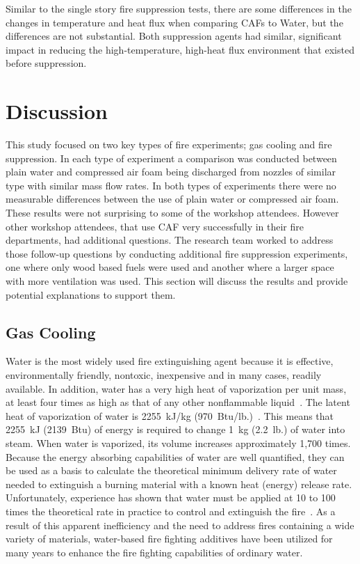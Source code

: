 \documentclass[12pt,oneside]{book}
\begin{document}
Similar to the single story fire suppression tests, there are some differences in the changes in temperature and heat flux when comparing CAFs to Water, but the differences are not substantial. Both suppression agents had similar, significant impact in reducing the high-temperature, high-heat flux environment that existed before suppression. 

\chapter{Discussion}
\label{chap:Discussion}

This study focused on two key types of fire experiments; gas cooling and fire suppression. In each type of experiment a comparison was conducted between plain water and compressed air foam being discharged from nozzles of similar type with similar mass flow rates.  In both types of experiments there were no measurable differences between the use of plain water or compressed air foam. These results were not surprising to some of the workshop attendees.  However other workshop attendees, that use CAF very successfully in their fire departments, had additional questions. The research team worked to address those follow-up questions by conducting additional fire suppression experiments, one where only wood based fuels were used and another where a larger space with more ventilation was used.  This section will discuss the results and provide potential explanations to support them.

\section{Gas Cooling}
\label{sec:Gas_Cooling_discuss}
 
Water is the most widely used fire extinguishing agent because it is effective, environmentally friendly, nontoxic, inexpensive and in many cases, readily available. In addition, water has a very high heat of vaporization per unit mass, at least four times as high as that of any other nonflammable liquid~\cite{NFPA}. The latent heat of vaporization of water is 2255~kJ/kg (970~Btu/lb.)~\cite{NFPA}. This means that 2255~kJ (2139~Btu) of energy is required to change 1~kg (2.2~lb.) of water into steam.  When water is vaporized, its volume increases approximately 1,700 times. Because the energy absorbing capabilities of water are well quantified, they can be used as a basis to calculate the theoretical minimum delivery rate of water needed to extinguish a burning material with a known heat (energy) release rate. Unfortunately, experience has shown that water must be applied at 10 to 100 times the theoretical rate in practice to control and extinguish the fire~\cite{Friedman:2}. As a result of this apparent inefficiency and the need to address fires containing a wide variety of materials, water-based fire fighting additives have been utilized for many years to enhance the fire fighting capabilities of ordinary water.
\end{document}
